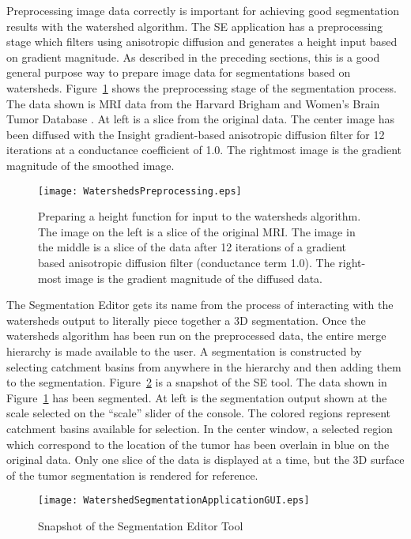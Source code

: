 Preprocessing image data correctly is important for achieving good segmentation
results with the watershed algorithm.  The SE application has a preprocessing
stage which filters using anisotropic diffusion and generates a height input
based on gradient magnitude.  As described in the preceding sections, this is a
good general purpose way to prepare image data for segmentations based on watersheds.
Figure~\ref{fig:preprocessWatersheds} shows the preprocessing stage of the
segmentation process.  The data shown is MRI data from the Harvard
Brigham and Women's Brain Tumor Database \cite{Kaus2001,Warfield2000b}.  At
left is a slice from the original data.  The center image has been diffused
with the Insight gradient-based anisotropic diffusion filter for 12 iterations
at a conductance coefficient of 1.0.  The rightmost image is the gradient
magnitude of the smoothed image.

\begin{figure}
\centering
\texttt{[image: WatershedsPreprocessing.eps]}
\caption{Preparing a height function for input to the watersheds algorithm.
The image on the left is a slice of the original MRI.  The image in the middle
is a slice of the data after 12 iterations of a gradient based anisotropic
diffusion filter (conductance term 1.0).  The right-most image is the gradient
magnitude of the diffused data.}
\protect\label{fig:preprocessWatersheds}
\end{figure}



The Segmentation Editor gets its name from the process of interacting with the
watersheds output to literally piece together a 3D segmentation.  Once the
watersheds algorithm has been run on the preprocessed data, the entire merge
hierarchy is made available to the user.  A segmentation is constructed by
selecting catchment basins from anywhere in the hierarchy and then adding them
to the segmentation.  Figure~\ref{fig:editingWatersheds} is a snapshot of the
SE tool.  The data shown in Figure~\ref{fig:preprocessWatersheds} has been
segmented.  At left is the segmentation output shown at the scale selected on
the ``scale'' slider of the console.  The colored regions represent catchment
basins available for selection.  In the center window, a selected region which
correspond to the location of the tumor has been overlain in blue on the
original data.  Only one slice of the data is displayed at a time, but the
3D surface of the tumor segmentation is rendered for reference.

\begin{figure}
\centering
\texttt{[image: WatershedSegmentationApplicationGUI.eps]}
\caption{Snapshot of the Segmentation Editor Tool}
\protect\label{fig:editingWatersheds}
\end{figure}

